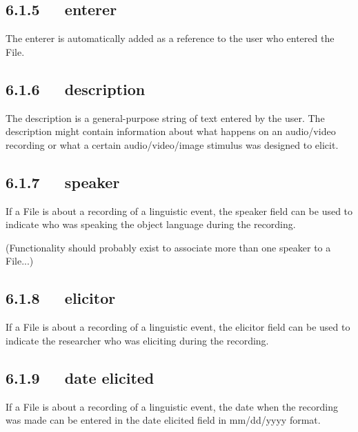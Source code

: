 \documentclass[letterpaper,10pt,english]{sphinxmanual}
\begin{document}
\subsection{6.1.5   enterer}
\label{user_guide:id2}
The enterer is automatically added as a reference to the user who entered the
File.


\subsection{6.1.6   description}
\label{user_guide:description}
The description is a general-purpose string of text entered by the user.  The
description might contain information about what happens on an audio/video
recording or what a certain audio/video/image stimulus was designed to elicit.


\subsection{6.1.7   speaker}
\label{user_guide:id3}
If a File is about a recording of a linguistic event, the speaker field can be
used to indicate who was speaking the object language during the recording.

(Functionality should probably exist to associate more than one speaker to a
File...)


\subsection{6.1.8   elicitor}
\label{user_guide:id4}
If a File is about a recording of a linguistic event, the elicitor field can be
used to indicate the researcher who was eliciting during the recording.


\subsection{6.1.9   date elicited}
\label{user_guide:id5}
If a File is about a recording of a linguistic event, the date when the
recording was made can be entered in the date elicited field in mm/dd/yyyy
format.
\end{document}
